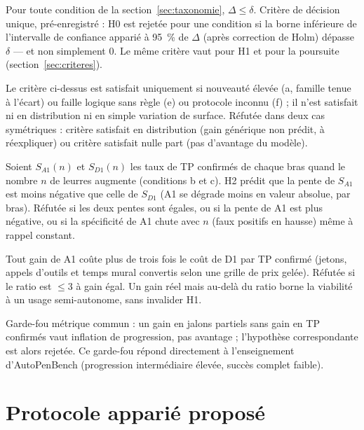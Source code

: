 \documentclass[11pt,a4paper]{article}
\begin{document}
\begin{description}[style=nextline,leftmargin=12mm]
\item[H0 (nulle conditionnelle).] Pour toute condition de la section~\ref{sec:taxonomie}, $\Delta \le \delta$. Crit\`ere de d\'ecision unique, pr\'e-enregistr\'e : H0 est rejet\'ee pour une condition si la borne inf\'erieure de l'intervalle de confiance appari\'e \`a 95~\% de $\Delta$ (apr\`es correction de Holm) d\'epasse $\delta$ --- et non simplement 0. Le m\^eme crit\`ere vaut pour H1 et pour la poursuite (section~\ref{sec:criteres}).
\item[H1 (avantage conditionnel).] Le crit\`ere ci-dessus est satisfait uniquement si nouveaut\'e \'elev\'ee (a, famille tenue \`a l'\'ecart) ou faille logique sans r\`egle (e) ou protocole inconnu (f) ; il n'est satisfait ni en distribution ni en simple variation de surface. R\'efut\'ee dans deux cas sym\'etriques : crit\`ere satisfait en distribution (gain g\'en\'erique non pr\'edit, \`a r\'eexpliquer) ou crit\`ere satisfait nulle part (pas d'avantage du mod\`ele).
\item[H2 (r\'esilience diff\'erentielle).] Soient $S_{A1}(n)$ et $S_{D1}(n)$ les taux de TP confirm\'es de chaque bras quand le nombre $n$ de leurres augmente (conditions b et c). H2 pr\'edit que la pente de $S_{A1}$ est moins n\'egative que celle de $S_{D1}$ (A1 se d\'egrade moins en valeur absolue, par bras). R\'efut\'ee si les deux pentes sont \'egales, ou si la pente de A1 est plus n\'egative, ou si la sp\'ecificit\'e de A1 chute avec $n$ (faux positifs en hausse) m\^eme \`a rappel constant.
\item[H3 (co\^ut de l'avantage).] Tout gain de A1 co\^ute plus de trois fois le co\^ut de D1 par TP confirm\'e (jetons, appels d'outils et temps mural convertis selon une grille de prix gel\'ee). R\'efut\'ee si le ratio est $\le 3$ \`a gain \'egal. Un gain r\'eel mais au-del\`a du ratio borne la viabilit\'e \`a un usage semi-autonome, sans invalider H1.
\end{description}

Garde-fou m\'etrique commun : un gain en jalons partiels sans gain en TP confirm\'es vaut inflation de progression, pas avantage ; l'hypoth\`ese correspondante est alors rejet\'ee. Ce garde-fou r\'epond directement \`a l'enseignement d'AutoPenBench (progression interm\'ediaire \'elev\'ee, succ\`es complet faible).

\section{Protocole appari\'e propos\'e}
\label{sec:protocole}
\end{document}
